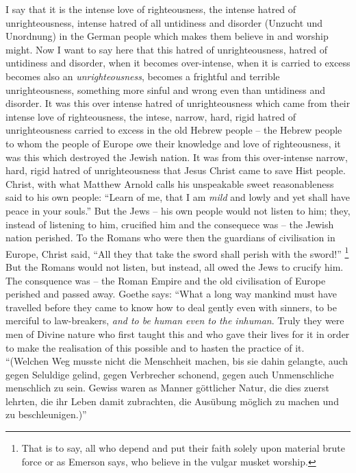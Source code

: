 I say that it is the intense love of righteousness, the intense hatred of unrighteousness, intense hatred of all untidiness and disorder (Unzucht und Unordnung) in the German people which makes them believe in and worship might.
Now I want to say here that this hatred of unrighteousness, hatred of untidiness and disorder, when it becomes over-intense, when it is carried to excess becomes also an \emph{unrighteousness}, becomes a frightful and terrible unrighteousness, something more sinful and wrong even than untidiness and disorder.
It was this over intense hatred of unrighteousness which came from their intense love of righteousness, the intese, narrow, hard, rigid hatred of unrighteousness carried to excess in the old Hebrew people -- the Hebrew people to whom the people of Europe owe their knowledge and love of righteousness, it was this which destroyed the Jewish nation.
It was from this over-intense narrow, hard, rigid hatred of unrighteousness that Jesus Christ came to save Hist people.
Christ, with what Matthew Arnold calls his unspeakable sweet reasonableness said to his own people: ``Learn of me, that I am \emph{mild} and lowly and yet shall have peace in your souls.'' But the Jews -- his own people would not listen to him;
they, instead of listening to him, crucified him and the consequece was --
the Jewish nation perished.
To the Romans who were then the guardians of civilisation in Europe, Christ said, ``All they that take the sword shall perish with the sword!''
\footnote{That is to say, all who depend and put their faith solely upon material brute force or as Emerson says, who believe in the vulgar musket worship.}
But the Romans would not listen, but instead, all owed the Jews to crucify him.
The consquence was -- the Roman Empire and the old civilisation of Europe perished and passed away.
Goethe says: ``What a long way mankind must have travelled before they came to know how to deal gently even with sinners, to be merciful to law-breakers,
\emph{and to be human even to the inhuman}.
Truly they were men of Divine nature who first taught this and who gave their lives for it in order to make the realisation of this possible and to hasten the practice of it.
``(Welchen Weg musste nicht die Menschheit machen, bis sie dahin gelangte, auch gegen Seluldige gelind, gegen Verbrecher schonend, gegen auch Unmenschliche menschlich zu sein. Gewiss waren as Manner g\"ottlicher Natur, die dies zuerst lehrten, die ihr Leben damit zubrachten, die Aus\"ubung m\"oglich zu machen und zu beschleunigen.)''

